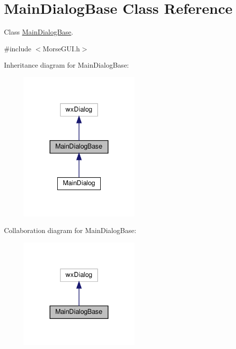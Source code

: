 \hypertarget{classMainDialogBase}{}\section{Main\+Dialog\+Base Class Reference}
\label{classMainDialogBase}


Class \hyperlink{classMainDialogBase}{Main\+Dialog\+Base}.  




{\ttfamily \#include $<$Morse\+G\+U\+I.\+h$>$}



Inheritance diagram for Main\+Dialog\+Base\+:\nopagebreak
\begin{figure}[H]
\begin{center}
\leavevmode
\includegraphics[width=168pt]{classMainDialogBase__inherit__graph}
\end{center}
\end{figure}


Collaboration diagram for Main\+Dialog\+Base\+:\nopagebreak
\begin{figure}[H]
\begin{center}
\leavevmode
\includegraphics[width=168pt]{classMainDialogBase__coll__graph}
\end{center}
\end{figure}
